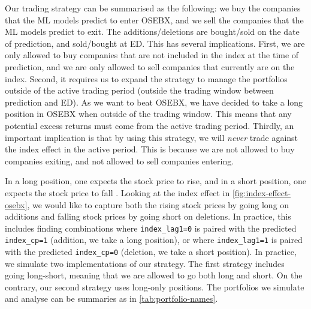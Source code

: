 Our trading strategy can be summarised as the following: we buy the companies that the ML models predict to enter OSEBX, and we sell the companies that the ML models predict to exit. The additions/deletions are bought/sold on the date of prediction, and sold/bought at ED. This has several implications. First, we are only allowed to buy companies that are not included in the index at the time of prediction, and we are only allowed to sell companies that currently are on the index. Second, it requires us to expand the strategy to manage the portfolios outside of the active trading period (outside the trading window between prediction and ED). As we want to beat OSEBX, we have decided to take a long position in OSEBX when outside of the trading window. This means that any potential excess returns must come from the active trading period. Thirdly, an important implication is that by using this strategy, we will \textit{never} trade against the index effect in the active period. This is because we are not allowed to buy companies exiting, and not allowed to sell companies entering. 


In a long position, one expects the stock price to rise, and in a short position, one expects the stock price to fall \parencite{jacobs-long-short}. Looking at the index effect in \autoref{fig:index-effect-osebx}, we would like to capture both the rising stock prices by going long on additions and falling stock prices by going short on deletions. In practice, this includes finding combinations where \texttt{index\_lag1=0} is paired with the predicted \texttt{index\_cp=1} (addition, we take a long position), or where \texttt{index\_lag1=1} is paired with the predicted \texttt{index\_cp=0} (deletion, we take a short position). In practice, we simulate two implementations of our strategy. The first strategy includes going long-short, meaning that we are allowed to go both long and short. On the contrary, our second strategy uses long-only positions. The portfolios we simulate and analyse can be summaries as in \autoref{tab:portfolio-names}. 


